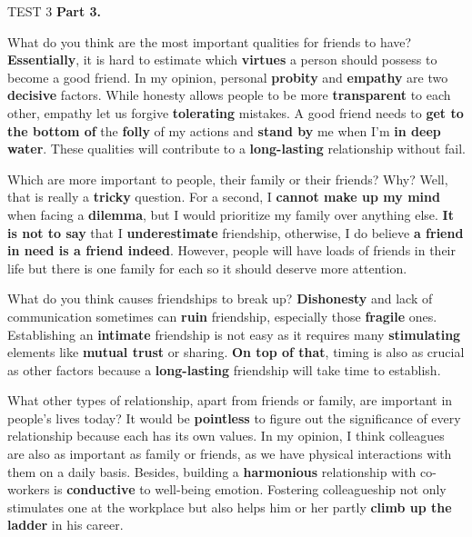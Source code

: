 \begin{glossarymc}[Cambridge 5]
\begin{test}{TEST 3}
    \noindent
    \textbf{Part 3.}
    \begin{qa}{What do you think are the most important qualities for friends to have?}
        \textbf{Essentially}, it is hard to estimate which \textbf{virtues} a person should possess to become a good friend. In my opinion, personal \textbf{probity} and \textbf{empathy} are two \textbf{decisive} factors. While honesty allows people to be more \textbf{transparent} to each other, empathy let us forgive \textbf{tolerating} mistakes. A good friend needs to \textbf{get to the bottom of} the \textbf{folly} of my actions and \textbf{stand by} me when I’m \textbf{in deep water}. These qualities will contribute to a \textbf{long-lasting} relationship without fail.
    \end{qa}

    \begin{qa}{Which are more important to people, their family or their friends? Why?}
        Well, that is really a \textbf{tricky} question. For a second, I \textbf{cannot make up my mind} when facing a \textbf{dilemma}, but I would prioritize my family over anything else. \textbf{It is not to say} that I \textbf{underestimate} friendship, otherwise, I do believe \textbf{a friend in need is a friend indeed}. However, people will have loads of friends in their life but there is one family for each so it should deserve more attention.
    \end{qa}

    \begin{qa}{What do you think causes friendships to break up?}
        \textbf{Dishonesty} and lack of communication sometimes can \textbf{ruin} friendship, especially those \textbf{fragile} ones. Establishing an \textbf{intimate} friendship is not easy as it requires many \textbf{stimulating} elements like \textbf{mutual trust} or sharing. \textbf{On top of that}, timing is also as crucial as other factors because a \textbf{long-lasting} friendship will take time to establish.
    \end{qa}

    \begin{qa}{What other types of relationship, apart from friends or family, are important in people's lives today?}
         It would be \textbf{pointless} to figure out the significance of every relationship because each has its own values. In my opinion, I think colleagues are also as important as family or friends, as we have physical interactions with them on a daily basis. Besides, building a \textbf{harmonious} relationship with co-workers is \textbf{conductive} to well-being emotion. Fostering colleagueship not only stimulates one at the workplace but also helps him or her partly \textbf{climb up the ladder} in his career.
    \end{qa}


\end{test}
\end{glossarymc}
